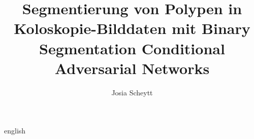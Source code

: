

\title{Segmentierung von Polypen in Koloskopie-Bilddaten mit Binary Segmentation Conditional Adversarial Networks}
\author{Josia Scheytt}






\tableofcontents

\clearpage
{}
\begin{abstract}
	
\end{abstract}

\clearpage
{}
\begin{otherlanguage*}{english}
\begin{abstract}
	
\end{abstract}
\end{otherlanguage*}









\listoffigures
\listoftables
\printglossary[type=\acronymtype,title={Abkürzungsverzeichnis}]
\printbibliography[heading=bibintoc]




